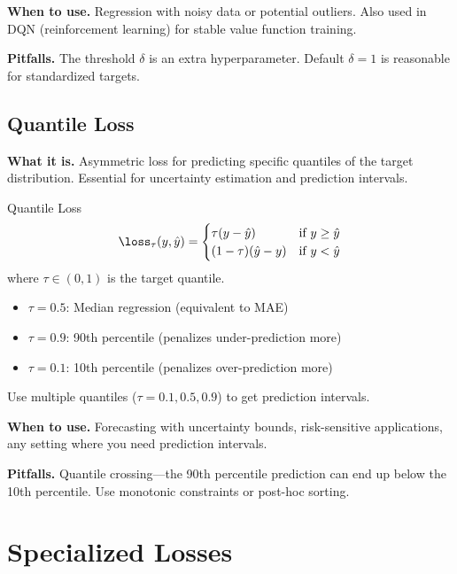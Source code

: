 \textbf{When to use.} Regression with noisy data or potential outliers. Also used in DQN (reinforcement learning) for stable value function training.

\textbf{Pitfalls.} The threshold $\delta$ is an extra hyperparameter. Default $\delta = 1$ is reasonable for standardized targets.

\subsection{Quantile Loss}

\textbf{What it is.} Asymmetric loss for predicting specific quantiles of the target distribution. Essential for uncertainty estimation and prediction intervals.

\begin{mathresult}{Quantile Loss}
\begin{equation}
\loss_\tau(y, \hat{y}) = \begin{cases}
\tau(y - \hat{y}) & \text{if } y \geq \hat{y} \\
(1-\tau)(\hat{y} - y) & \text{if } y < \hat{y}
\end{cases}
\end{equation}
where $\tau \in (0, 1)$ is the target quantile.
\end{mathresult}

\begin{itemize}
    \item $\tau = 0.5$: Median regression (equivalent to MAE)
    \item $\tau = 0.9$: 90th percentile (penalizes under-prediction more)
    \item $\tau = 0.1$: 10th percentile (penalizes over-prediction more)
\end{itemize}

Use multiple quantiles ($\tau = 0.1, 0.5, 0.9$) to get prediction intervals.

\textbf{When to use.} Forecasting with uncertainty bounds, risk-sensitive applications, any setting where you need prediction intervals.

\textbf{Pitfalls.} Quantile crossing---the 90th percentile prediction can end up below the 10th percentile. Use monotonic constraints or post-hoc sorting.

\section{Specialized Losses}
\label{sec:specialized_losses}

